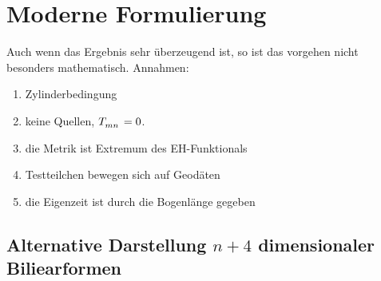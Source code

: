 \chapter{Moderne Formulierung}
Auch wenn das Ergebnis sehr überzeugend ist, so ist das vorgehen nicht besonders
mathematisch. Annahmen:
\begin{enumerate}
\item Zylinderbedingung
\item keine Quellen, $\tensor{T}{_m_n}=0$.
\item die Metrik ist Extremum des EH-Funktionals
\item Testteilchen bewegen sich auf Geodäten
\item die Eigenzeit ist durch die Bogenlänge gegeben
\end{enumerate}
\section{Alternative Darstellung $n+4$ dimensionaler Biliearformen}
